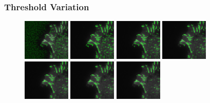 \documentclass{beamer}
\begin{document}
\begin{frame}
	\frametitle{Threshold Variation}
	\begin{figure}
		\includegraphics[width=0.2\textwidth]{figures/finding/thresh_examples/00.png}
		\includegraphics[width=0.2\textwidth]{figures/finding/thresh_examples/01.png}
		\includegraphics[width=0.2\textwidth]{figures/finding/thresh_examples/02.png}
		\includegraphics[width=0.2\textwidth]{figures/finding/thresh_examples/03.png}
		\\
		\includegraphics[width=0.2\textwidth]{figures/finding/thresh_examples/04.png}
		\includegraphics[width=0.2\textwidth]{figures/finding/thresh_examples/05.png}
		\includegraphics[width=0.2\textwidth]{figures/finding/thresh_examples/06.png}

\end{figure}
\end{frame}
\end{document}
